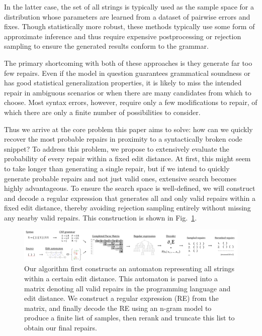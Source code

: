 \documentclass[sigplan,review,acmsmall,nonacm,screen,anonymous]{acmart}\settopmatter{printfolios=false,printccs=false,printacmref=false}
\begin{document}
In the latter case, the set of all strings is typically used as the sample space for a distribution whose parameters are learned from a dataset of pairwise errors and fixes. Though statistically more robust, these methods typically use some form of approximate inference and thus require expensive postprocessing or rejection sampling to ensure the generated results conform to the grammar.

The primary shortcoming with both of these approaches is they generate far too few repairs. Even if the model in question guarantees grammatical soundness or has good statistical generalization properties, it is likely to miss the intended repair in ambiguous scenarios or when there are many candidates from which to choose. Most syntax errors, however, require only a few modifications to repair, of which there are only a finite number of possibilities to consider.

Thus we arrive at the core problem this paper aims to solve: how can we quickly recover the most probable repairs in proximity to a syntactically broken code snippet? To address this problem, we propose to extensively evaluate the probability of every repair within a fixed edit distance. At first, this might seem to take longer than generating a single repair, but if we intend to quickly generate probable repairs and not just valid ones, extensive search becomes highly advantageous. To ensure the search space is well-defined, we will construct and decode a regular expression that generates all and only valid repairs within a fixed edit distance, thereby avoiding rejection sampling entirely without missing any nearby valid repairs. This construction is shown in Fig.~\ref{fig:arch_simp}.

\begin{figure}[H]
  \includegraphics[width=\textwidth]{flow}\vspace{-0.1cm}
  \caption{
    Our algorithm first constructs an automaton representing all strings within a certain edit distance. This automaton is parsed into a matrix denoting all valid repairs in the programming language and edit distance. We construct a regular expression (RE) from the matrix, and finally decode the RE using an n-gram model to produce a finite list of samples, then rerank and truncate this list to obtain our final repairs.
  }\label{fig:arch_simp}\vspace{-0.2cm}
\end{figure}
\end{document}
